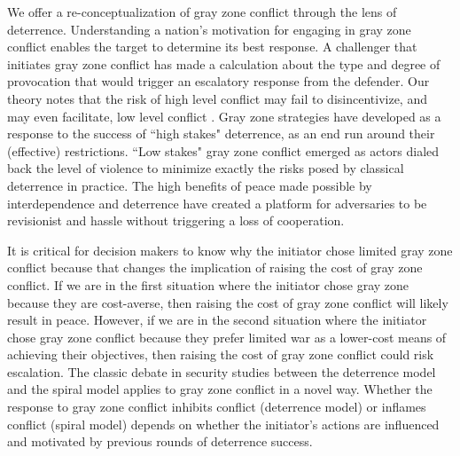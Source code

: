 \documentclass[12pt,letterpaper]{article}
\begin{document}
	We offer a re-conceptualization of gray zone conflict through the lens of deterrence. Understanding a nation's motivation for engaging in gray zone conflict enables the target to determine its best response. A challenger that initiates gray zone conflict has made a calculation about the type and degree of provocation that would trigger an escalatory response from the defender. Our theory notes that the risk of high level conflict may fail to disincentivize, and may even facilitate, low level conflict \citep{snyder_balancepowerbalance_1967}. Gray zone strategies have developed as a response to the success of ``high stakes" deterrence, as an end run around their (effective) restrictions. ``Low stakes" gray zone conflict emerged as actors dialed back the level of violence to minimize exactly the risks posed by classical deterrence in practice. The high benefits of peace made possible by interdependence and deterrence have created a platform for adversaries to be revisionist and hassle without triggering a loss of cooperation.
	
	It is critical for decision makers to know why the initiator chose limited gray zone conflict because that changes the implication of raising the cost of gray zone conflict. If we are in the first situation where the initiator chose gray zone because they are cost-averse, then raising the cost of gray zone conflict will likely result in peace. However, if we are in the second situation where the initiator chose gray zone conflict because they prefer limited war as a lower-cost means of achieving their objectives, then raising the cost of gray zone conflict could risk escalation. The classic debate in security studies between the deterrence model and the spiral model applies to gray zone conflict in a novel way. Whether the response to gray zone conflict inhibits conflict (deterrence model) or inflames conflict (spiral model) depends on whether the initiator's actions are influenced and motivated by previous rounds of deterrence success.



\end{document}
